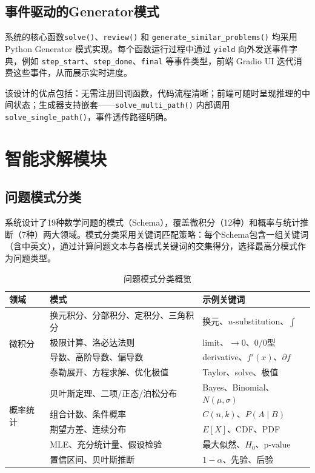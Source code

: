 \documentclass[12pt,a4paper]{ctexart}
\begin{document}
\subsection{事件驱动的Generator模式}

系统的核心函数\texttt{solve()}、\texttt{review()} 和 \texttt{generate\_similar\_problems()} 均采用 Python Generator 模式实现。每个函数运行过程中通过 \texttt{yield} 向外发送事件字典，例如 \texttt{step\_start}、\texttt{step\_done}、\texttt{final} 等事件类型，前端 Gradio UI 迭代消费这些事件，从而展示实时进度。

该设计的优点包括：无需注册回调函数，代码流程清晰；前端可随时呈现推理的中间状态；生成器支持嵌套——\texttt{solve\_multi\_path()} 内部调用 \texttt{solve\_single\_path()}，事件透传路径明确。

\section{智能求解模块}

\subsection{问题模式分类}

系统设计了19种数学问题的模式（Schema），覆盖微积分（12种）和概率与统计推断（7种）两大领域。模式分类采用关键词匹配策略：每个Schema包含一组关键词（含中英文），通过计算问题文本与各模式关键词的交集得分，选择最高分模式作为问题类型。

\begin{table}[H]
\centering
\caption{问题模式分类概览}
\begin{tabular}{@{}lll@{}}
\toprule
\textbf{领域} & \textbf{模式} & \textbf{示例关键词} \\
\midrule
\multirow{4}{*}{微积分} & 换元积分、分部积分、定积分、三角积分 & 换元、$u$-substitution、$\int$\\
                        & 极限计算、洛必达法则 & limit、$\to 0$、$0/0$型\\
                        & 导数、高阶导数、偏导数 & derivative、$f'(x)$、$\partial f$\\
                        & 泰勒展开、方程求解、优化极值 & Taylor、solve、极值\\
\midrule
\multirow{4}{*}{概率统计} & 贝叶斯定理、二项/正态/泊松分布 & Bayes、Binomial、$N(\mu,\sigma)$\\
                        & 组合计数、条件概率 & $C(n,k)$、$P(A\mid B)$\\
                        & 期望方差、连续分布 & $E[X]$、CDF、PDF\\
                        & MLE、充分统计量、假设检验 & 最大似然、$H_0$、p-value\\
                        & 置信区间、贝叶斯推断 & $1-\alpha$、先验、后验\\
\bottomrule
\end{tabular}
\end{table}
\end{document}
